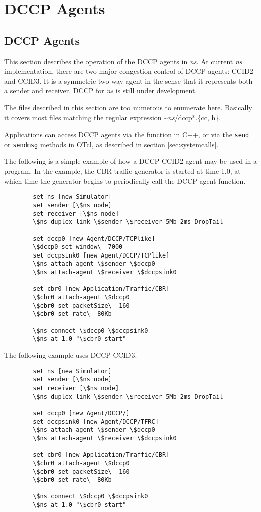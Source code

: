 \chapter{DCCP Agents}
\label{sec:dccpAgents}

\section{DCCP Agents}
\label{sec:dccpagent}
This section describes the operation of the DCCP agents in \emph{ns}.
At current \emph{ns} implementation, there are two major congestion 
control of DCCP agents: CCID2 and CCID3.
It is a symmetric two-way agent in the sense that it represents
both a sender and receiver.
DCCP for \emph{ns} is still under development.

The files described in this section are too numerous to enumerate here.
Basically it covers most files matching the regular expression
\textasciitilde\emph{ns}/{dccp*.\{cc, h\}}.

Applications can access DCCP agents via the  function in C++,
or via the {\tt send} or {\tt sendmsg} methods in OTcl, as described in
section \ref{sec:systemcalls}.  

The following is a simple example of how a DCCP CCID2 agent may be used in a program.  
In the example, the CBR traffic generator is started at time 1.0, at which time
the generator begins to periodically call the DCCP agent 
function.

\begin{verbatim}
        set ns [new Simulator]
        set sender [\$ns node]
        set receiver [\$ns node]
        \$ns duplex-link \$sender \$receiver 5Mb 2ms DropTail

        set dccp0 [new Agent/DCCP/TCPlike]
        \$dccp0 set window\_ 7000
        set dccpsink0 [new Agent/DCCP/TCPlike]
        \$ns attach-agent \$sender \$dccp0
        \$ns attach-agent \$receiver \$dccpsink0
      
        set cbr0 [new Application/Traffic/CBR]
        \$cbr0 attach-agent \$dccp0
        \$cbr0 set packetSize\_ 160
        \$cbr0 set rate\_ 80Kb

        \$ns connect \$dccp0 \$dccpsink0
        \$ns at 1.0 "\$cbr0 start"
\end{verbatim}

The following example uses DCCP CCID3.
\begin{verbatim}
        set ns [new Simulator]
        set sender [\$ns node]
        set receiver [\$ns node]
        \$ns duplex-link \$sender \$receiver 5Mb 2ms DropTail

        set dccp0 [new Agent/DCCP/]
        set dccpsink0 [new Agent/DCCP/TFRC]
        \$ns attach-agent \$sender \$dccp0
        \$ns attach-agent \$receiver \$dccpsink0
      
        set cbr0 [new Application/Traffic/CBR]
        \$cbr0 attach-agent \$dccp0
        \$cbr0 set packetSize\_ 160
        \$cbr0 set rate\_ 80Kb

        \$ns connect \$dccp0 \$dccpsink0
        \$ns at 1.0 "\$cbr0 start"
\end{verbatim}

